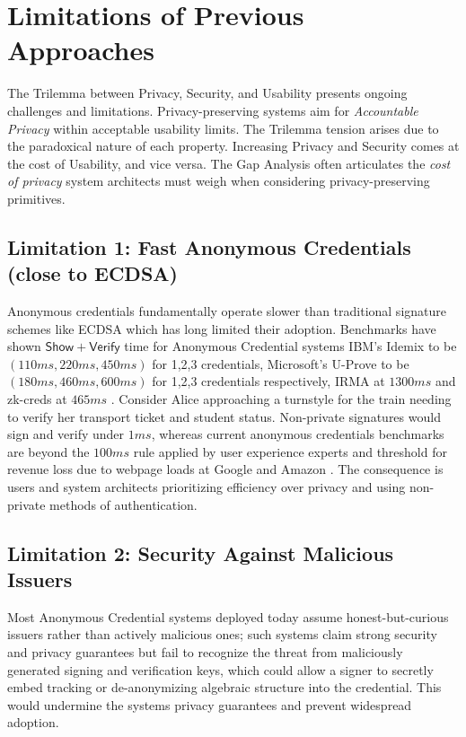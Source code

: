 \section{Limitations of Previous Approaches}
The Trilemma between Privacy, Security, and Usability presents ongoing challenges and limitations. Privacy-preserving systems aim for \emph{Accountable Privacy} within acceptable usability limits. The Trilemma tension arises due to the paradoxical nature of each property. Increasing Privacy and Security comes at the cost of Usability, and vice versa. The Gap Analysis often articulates the \emph{cost of privacy} system architects must weigh when considering privacy-preserving primitives.

\subsection{Limitation 1: Fast Anonymous Credentials (close to ECDSA)}\label{subsec:chap1_limitation1}

Anonymous credentials fundamentally operate slower than traditional signature schemes like ECDSA which has long limited their adoption. Benchmarks \cite{habib_evaluation_2016} have shown $\mathsf{Show + Verify}$ time for Anonymous Credential systems IBM's Idemix to be $(110ms, 220ms, 450ms)$ for 1,2,3 credentials, Microsoft's U-Prove to be $(180ms, 460ms, 600ms)$ for 1,2,3 credentials respectively, IRMA \cite{fischer-hubner_towards_2013} at $1300ms$ and zk-creds at $465ms$ \cite{rosenberg_zk-creds_2022}. Consider Alice approaching a turnstyle for the train needing to verify her transport ticket and student status. Non-private signatures would sign and verify under $1ms$, whereas current anonymous credentials benchmarks are beyond the $100ms$ rule applied by user experience experts \cite{jakob_nielsen_powers_2009} and threshold for revenue loss due to webpage loads at Google and Amazon \cite{linden_geeking_2006}. The consequence is users and system architects prioritizing efficiency over privacy and using non-private methods of authentication. 


\subsection{Limitation 2: Security Against Malicious Issuers}
Most Anonymous Credential systems deployed today assume honest-but-curious issuers rather than actively malicious ones; such systems claim strong security and privacy guarantees but fail to recognize the threat from maliciously generated signing and verification keys, which could allow a signer to secretly embed tracking or de-anonymizing algebraic structure into the credential. This would undermine the systems privacy guarantees and prevent widespread adoption. 


